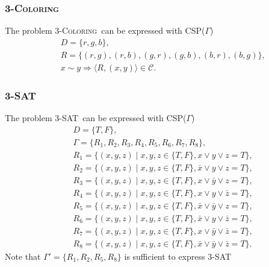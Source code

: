 \documentclass[a4paper,handout]{beamer}
\newcommand{\pname}[1]{\textsc{#1}}
\newcommand{\tsat}{3-SAT}
\newcommand{\tcoloring}{3-\pname{Coloring}}
\newcommand{\setof}[1]{\{{#1}\}}
\theoremstyle{definition}
\begin{document}
\begin{frame}
\frametitle{\tcoloring}
The problem \tcoloring\ can be expressed with CSP(\(\Gamma\))
\vskip 12pt
\begin{eqnarray*}
&&D=\{r,g,b\},\\
&&R=\{(r,g),(r,b),(g,r),(g,b),(b,r), (b,g)\},\\
&&x\sim y \Rightarrow \langle R, (x,y)\rangle \in \mathcal{C}.
\end{eqnarray*}
\end{frame}

\begin{frame}
\frametitle{\tsat}
The problem \tsat\ can be expressed with CSP(\(\Gamma\))
\begin{eqnarray*}
&&D=\{T,F\},\\
&&\Gamma = \{R_1, R_2, R_3, R_4, R_5, R_6, R_7, R_8\},\\
&&R_1=\{(x,y,z)\mid x,y,z\in \setof{T,F}, x \lor y \lor z = T\},\\
&&R_2=\{(x,y,z)\mid x,y,z\in \setof{T,F}, \bar x \lor y \lor z = T\},\\
&&R_3=\{(x,y,z)\mid x,y,z\in \setof{T,F}, x \lor \bar y \lor z = T\},\\
&&R_4=\{(x,y,z)\mid x,y,z\in \setof{T,F}, x \lor y \lor \bar z = T\},\\
&&R_5=\{(x,y,z)\mid x,y,z\in \setof{T,F}, \bar x \lor \bar y \lor z = T\},\\
&&R_6=\{(x,y,z)\mid x,y,z\in \setof{T,F}, \bar x \lor y \lor \bar z = T\},\\
&&R_7=\{(x,y,z)\mid x,y,z\in \setof{T,F}, x \lor \bar y \lor \bar z = T\},\\
&&R_8=\{(x,y,z)\mid x,y,z\in \setof{T,F}, \bar x \lor \bar y \lor \bar z = T\}.
\end{eqnarray*}
\pause
Note that \(\Gamma' = \{R_1, R_2, R_5, R_8\}\) is sufficient to express \tsat
\end{frame}
\end{document}
